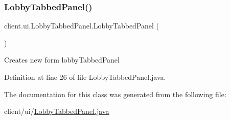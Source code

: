 \subsubsection{\texorpdfstring{Lobby\+Tabbed\+Panel()}{LobbyTabbedPanel()}}
{\footnotesize\ttfamily client.\+ui.\+Lobby\+Tabbed\+Panel.\+Lobby\+Tabbed\+Panel (\begin{DoxyParamCaption}{ }\end{DoxyParamCaption})}

Creates new form lobby\+Tabbed\+Panel 

Definition at line 26 of file Lobby\+Tabbed\+Panel.\+java.



The documentation for this class was generated from the following file\+:\begin{DoxyCompactItemize}
\item 
client/ui/\hyperlink{_lobby_tabbed_panel_8java}{Lobby\+Tabbed\+Panel.\+java}\end{DoxyCompactItemize}
